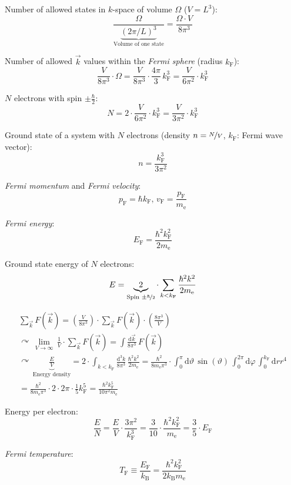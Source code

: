 \documentclass[fontsize=11pt,a4paper]{scrartcl}
\begin{document}
Number of allowed states in $k$-space of volume $\Omega$ ($V=L^3$):
\[
	\frac{\Omega}{\underbrace{(2\pi/L)^3}_\text{Volume of one state}}=\frac{\Omega\cdot V}{8\pi^3}
\]

Number of allowed $\vec k$ values within the \emph{Fermi sphere} (radius $k_\mathrm{F}$):
\[
	\frac{V}{8\pi^3}\cdot\Omega=\frac{V}{8\pi^3}\cdot\frac{4\pi}{3}\,k_\mathrm{F}^3=\frac{V}{6\pi^2}\cdot k_\mathrm{F}^3
\]

$N$ electrons with spin $\pm\frac{\hbar}{2}$:
\[
	N=2\cdot\frac{V}{6\pi^2}\cdot k_\mathrm{F}^3=\frac{V}{3\pi^2}\cdot k_\mathrm{F}^3
\]

Ground state of a system with $N$ electrons (density $n=\nicefrac{N}{V}$, $k_\mathrm{F}$: Fermi wave vector):
\[
	n=\frac{k_\mathrm{F}^3}{3\pi^2}
\]

\emph{Fermi momentum} and \emph{Fermi velocity}:
\[
	p_\mathrm{F}=\hbar k_\mathrm{F},\,v_\mathrm{F}=\frac{p_\mathrm{F}}{m_\mathrm{e}}
\]

\emph{Fermi energy}:
\[
	E_\mathrm{F}=\frac{\hbar^2 k_\mathrm{F}^2}{2m_\mathrm{e}}
\]

Ground state energy of $N$ electrons:
\[
	E=\underbrace{2}_{\text{Spin }\pm\nicefrac{\hbar}{2}}\cdot\sum_{k<k_\mathrm{F}}\frac{\hbar^2 k^2}{2m_\mathrm{e}}
\]

\begin{gather*}
	\sum_{\vec k}F(\vec k)=\left(\frac{V}{8\pi^3}\right)\cdot\sum_{\vec k}F(\vec k)\cdot\left(\frac{8\pi^3}{V}\right)\\
	\curvearrowright\,\lim_{V\to\infty}\,\frac{1}{V}\cdot\sum_{\vec k}F(\vec k)=\int\frac{\mathrm{d}\vec k}{8\pi^3}\,F(\vec k)\\
	\curvearrowright\,\underbrace{\frac{E}{V}}_\text{Energy density}=2\cdot\int_{k<k_\mathrm{F}}\frac{\mathrm{d}^3 k}{8\pi^3}\,\frac{\hbar^2 k^2}{2m_\mathrm{e}}=\frac{\hbar^2}{8m_\mathrm{e}\pi^3}\cdot\int_0^\pi\mathrm{d}\vartheta\,\sin(\vartheta)\,\int_0^{2\pi}\mathrm{d}\varphi\,\int_0^{k_\mathrm{F}}\mathrm{d}r r^4\\
	=\frac{\hbar^2}{8m_\mathrm{e}\pi^3}\cdot 2\cdot 2\pi\cdot\frac{1}{5}k_\mathrm{F}^5=\frac{\hbar^2 k_\mathrm{F}^5}{10\pi^2 m_\mathrm{e}}
\end{gather*}

Energy per electron:
\[
	\frac{E}{N}=\frac{E}{V}\cdot\frac{3\pi^2}{k_\mathrm{F}^3}=\frac{3}{10}\cdot\frac{\hbar^2 k_\mathrm{F}^2}{m_\mathrm{e}}=\frac{3}{5}\cdot E_\mathrm{F}
\]

\emph{Fermi temperature}:
\[
	T_\mathrm{F}\equiv\frac{E_\mathrm{F}}{k_\mathrm{B}}=\frac{\hbar^2 k_\mathrm{F}^2}{2k_\mathrm{B} m_\mathrm{e}}
\]
\end{document}
